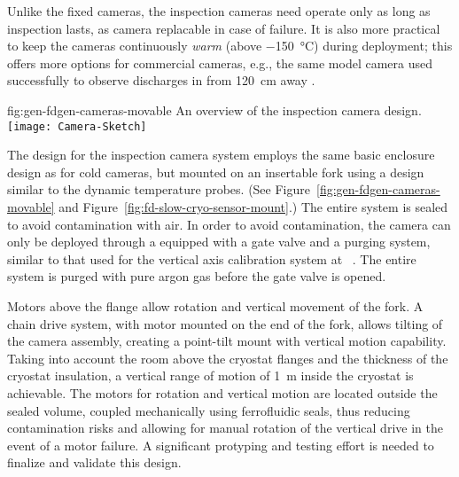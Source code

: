 Unlike the fixed cameras, the inspection cameras need operate only as
long as inspection lasts, as camera replacable in case of failure.  It
is also more practical to keep the cameras continuously \textit{warm}
(above \SI{-150}{\celsius}) during deployment; this offers %
more options for commercial cameras, e.g., %
the same model camera used successfully to observe discharges
in \lar from \SI{120}{cm} away \cite{Auger:2015xlo}.

\begin{dunefigure}{fig:gen-fdgen-cameras-movable}
  {An overview of the inspection camera design.}
  \texttt{[image: Camera-Sketch]}%
\end{dunefigure}

The design for the inspection camera system employs the same basic
enclosure design as for cold cameras, but mounted on an insertable
fork using a design similar to the dynamic temperature probes. (See
Figure~\ref{fig:gen-fdgen-cameras-movable} and
Figure~\ref{fig:fd-slow-cryo-sensor-mount}.)  The entire system is sealed to
avoid contamination with air. In order to avoid contamination, the
camera can only be deployed through a \fdth equipped with a gate
valve and a purging system, similar to that used for the vertical axis
calibration system at \kamland~\cite{Banks:2014hra}. The entire system
is  purged with pure argon gas before the gate valve is opened.

Motors above the flange allow rotation and vertical movement of the fork. 
 A chain drive system, with motor
mounted on the end of the fork, allows tilting of the camera assembly, 
creating a point-tilt mount with vertical motion capability.
Taking into account the room above the cryostat flanges and the
thickness of the cryostat insulation, a vertical range of motion of
\SI{1}{m} inside the cryostat is achievable.
The motors for rotation and vertical motion are located outside the sealed
volume, coupled mechanically using ferrofluidic seals, thus reducing
contamination risks and allowing for manual rotation of the vertical
drive in the event of a motor failure.  A significant protyping and
testing effort is needed to finalize and validate this design.

